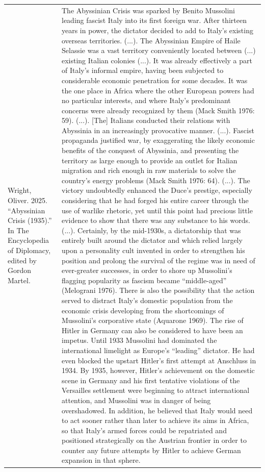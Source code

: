 {\begin{longtable}{p{}p{}}
\\
Wright, Oliver. 2025. “Abyssinian Crisis (1935).” In The Encyclopedia of Diplomacy, edited by Gordon Martel. & The Abyssinian Crisis was sparked by Benito Mussolini leading fascist Italy into its first foreign war. After thirteen years in power, the dictator decided to add to Italy's existing overseas territories. (...). The Abyssinian Empire of Haile Selassie was a vast territory conveniently located between (...) existing Italian colonies (...). It was already effectively a part of Italy's informal empire, having been subjected to considerable economic penetration for some decades. It was the one place in Africa where the other European powers had no particular interests, and where Italy's predominant concerns were already recognized by them (Mack Smith 1976: 59). (...). [The] Italians conducted their relations with Abyssinia in an increasingly provocative manner. (...). Fascist propaganda justified war, by exaggerating the likely economic benefits of the conquest of Abyssinia, and presenting the territory as large enough to provide an outlet for Italian migration and rich enough in raw materials to solve the country's energy problems (Mack Smith 1976: 64). (...). The victory undoubtedly enhanced the Duce's prestige, especially considering that he had forged his entire career through the use of warlike rhetoric, yet until this point had precious little evidence to show that there was any substance to his words. (...). Certainly, by the mid-1930s, a dictatorship that was entirely built around the dictator and which relied largely upon a personality cult invented in order to strengthen his position and prolong the survival of the regime was in need of ever-greater successes, in order to shore up Mussolini's flagging popularity as fascism became “middle-aged” (Melograni 1976). There is also the possibility that the action served to distract Italy's domestic population from the economic crisis developing from the shortcomings of Mussolini's corporative state (Aquarone 1969). The rise of Hitler in Germany can also be considered to have been an impetus. Until 1933 Mussolini had dominated the international limelight as Europe's “leading” dictator. He had even blocked the upstart Hitler's first attempt at Anschluss in 1934. By 1935, however, Hitler's achievement on the domestic scene in Germany and his first tentative violations of the Versailles settlement were beginning to attract international attention, and Mussolini was in danger of being overshadowed. In addition, he believed that Italy would need to act sooner rather than later to achieve its aims in Africa, so that Italy's armed forces could be repatriated and positioned strategically on the Austrian frontier in order to counter any future attempts by Hitler to achieve German expansion in that sphere.

\end{longtable}}
